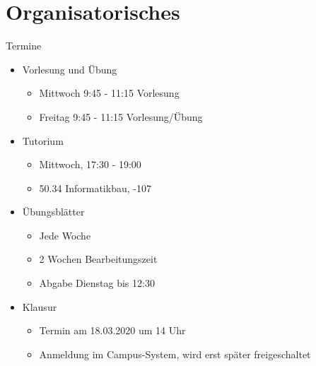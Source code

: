 \documentclass{beamer}
\begin{document}

\begin{frame}
	\titlepage
\end{frame}

\section{Organisatorisches}

\begin{frame}{Termine}
	\begin{itemize}
		 
		\item Vorlesung und Übung
			\begin{itemize}
				\item Mittwoch 9:45 - 11:15 Vorlesung
				\item Freitag 9:45 - 11:15 Vorlesung/Übung
			\end{itemize}
		
		 
		\item Tutorium
			\begin{itemize}
				\item Mittwoch, 17:30 - 19:00
				\item 50.34 Informatikbau, -107
			\end{itemize}
		
		 
		\item Übungsblätter
		\begin{itemize}
			\item Jede Woche
			\item 2 Wochen Bearbeitungszeit
			\item Abgabe Dienstag bis 12:30
		\end{itemize}
		 
		\item Klausur
		\begin{itemize}
			\item Termin am 18.03.2020 um 14 Uhr
			\item Anmeldung im Campus-System, wird erst später freigeschaltet
		\end{itemize}
	\end{itemize}
\end{frame}
\end{document}
